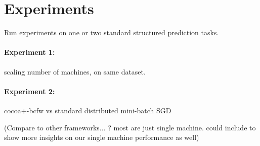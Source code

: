 
\section{Experiments}\label{sec:experiments}

Run experiments on one or two standard structured prediction tasks.

\paragraph{Experiment 1:} 
scaling number of machines, on same dataset.

\paragraph{Experiment 2:}
cocoa+-bcfw vs standard distributed mini-batch SGD


(Compare to other frameworks... ? most are just single machine. could include to show more insights on our single machine performance as well)
